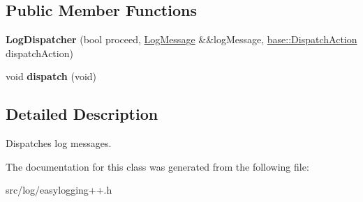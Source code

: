 \subsection*{Public Member Functions}
\begin{DoxyCompactItemize}
\item 
{\bfseries Log\+Dispatcher} (bool proceed, \hyperlink{classel_1_1LogMessage}{Log\+Message} \&\&log\+Message, \hyperlink{namespaceel_1_1base_a3aa2563d38e47388ba242a1694fc2839}{base\+::\+Dispatch\+Action} dispatch\+Action)\hypertarget{classel_1_1base_1_1LogDispatcher_aef59d9895c348f0b3ad5a776276f1c22}{}\label{classel_1_1base_1_1LogDispatcher_aef59d9895c348f0b3ad5a776276f1c22}

\item 
void {\bfseries dispatch} (void)\hypertarget{classel_1_1base_1_1LogDispatcher_a88d4a644364bb454136c85338f05da7a}{}\label{classel_1_1base_1_1LogDispatcher_a88d4a644364bb454136c85338f05da7a}

\end{DoxyCompactItemize}


\subsection{Detailed Description}
Dispatches log messages. 

The documentation for this class was generated from the following file\+:\begin{DoxyCompactItemize}
\item 
src/log/easylogging++.\+h\end{DoxyCompactItemize}
